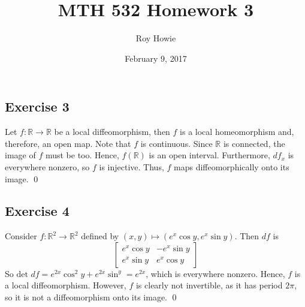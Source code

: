 \documentclass{article}
\newcommand{\R}{\mathbb{R}}
\begin{document}
\title{MTH 532 Homework 3}
\author{Roy Howie}
\date{February 9, 2017}
\maketitle

\subsection*{Exercise 3}
  Let $f\colon\R\to\R$ be a local diffeomorphism, then $f$ is a local
  homeomorphism and, therefore, an open map. Note that $f$ is continuous. Since
  $\R$ is connected, the image of $f$ must be too. Hence, $f(\R)$ is an open
  interval. Furthermore, $df_x$ is everywhere nonzero, so $f$ is injective.
  Thus, $f$ maps diffeomorphically onto its image.
  \qed

\subsection*{Exercise 4}
  Consider $f\colon\R^2\to\R^2$ defined by $(x,y)\mapsto(e^x\cos y, e^x\sin y)$.
  Then $df$ is
  \begin{equation*}
    \begin{bmatrix}
      e^x\cos{y} & -e^x\sin{y}\\
      e^x\sin{y} &  e^x\cos{y}
    \end{bmatrix}
  \end{equation*}
  So $\text{det }df = e^{2x}\cos^2y+e^{2x}\sin^y=e^{2x}$, which is everywhere
  nonzero. Hence, $f$ is a local diffeomorphism. However, $f$ is clearly not
  invertible, as it has period $2\pi$, so it is not a diffeomorphism onto its
  image.
  \qed
\end{document}
